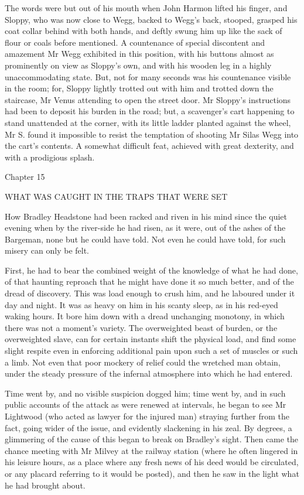 The words were but out of his mouth when John Harmon lifted his finger,
and Sloppy, who was now close to Wegg, backed to Wegg’s back, stooped,
grasped his coat collar behind with both hands, and deftly swung him
up like the sack of flour or coals before mentioned. A countenance of
special discontent and amazement Mr Wegg exhibited in this position,
with his buttons almost as prominently on view as Sloppy’s own, and
with his wooden leg in a highly unaccommodating state. But, not for many
seconds was his countenance visible in the room; for, Sloppy lightly
trotted out with him and trotted down the staircase, Mr Venus attending
to open the street door. Mr Sloppy’s instructions had been to deposit
his burden in the road; but, a scavenger’s cart happening to stand
unattended at the corner, with its little ladder planted against the
wheel, Mr S. found it impossible to resist the temptation of shooting Mr
Silas Wegg into the cart’s contents. A somewhat difficult feat, achieved
with great dexterity, and with a prodigious splash.



Chapter 15

WHAT WAS CAUGHT IN THE TRAPS THAT WERE SET


How Bradley Headstone had been racked and riven in his mind since the
quiet evening when by the river-side he had risen, as it were, out of
the ashes of the Bargeman, none but he could have told. Not even he
could have told, for such misery can only be felt.

First, he had to bear the combined weight of the knowledge of what he
had done, of that haunting reproach that he might have done it so much
better, and of the dread of discovery. This was load enough to crush
him, and he laboured under it day and night. It was as heavy on him in
his scanty sleep, as in his red-eyed waking hours. It bore him down with
a dread unchanging monotony, in which there was not a moment’s variety.
The overweighted beast of burden, or the overweighted slave, can for
certain instants shift the physical load, and find some slight respite
even in enforcing additional pain upon such a set of muscles or such
a limb. Not even that poor mockery of relief could the wretched man
obtain, under the steady pressure of the infernal atmosphere into which
he had entered.

Time went by, and no visible suspicion dogged him; time went by, and
in such public accounts of the attack as were renewed at intervals,
he began to see Mr Lightwood (who acted as lawyer for the injured man)
straying further from the fact, going wider of the issue, and evidently
slackening in his zeal. By degrees, a glimmering of the cause of this
began to break on Bradley’s sight. Then came the chance meeting with Mr
Milvey at the railway station (where he often lingered in his leisure
hours, as a place where any fresh news of his deed would be circulated,
or any placard referring to it would be posted), and then he saw in the
light what he had brought about.

